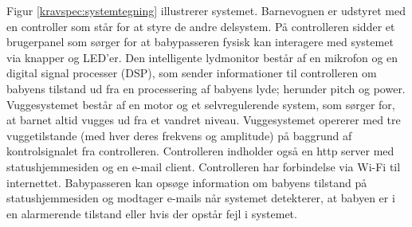 Figur \ref{kravspec:systemtegning} illustrerer systemet. Barnevognen er udstyret med en controller som står for at styre de andre delsystem. På controlleren sidder et brugerpanel som sørger for at babypasseren fysisk kan interagere med systemet via knapper og LED'er.
Den intelligente lydmonitor består af en mikrofon og en digital signal processer (DSP), som sender informationer til controlleren om babyens tilstand ud fra en processering af babyens lyde; herunder pitch og power. Vuggesystemet består af en motor og et selvregulerende system, som sørger for, at barnet altid vugges ud fra et vandret niveau. Vuggesystemet opererer med tre vuggetilstande (med hver deres frekvens og amplitude) på baggrund af kontrolsignalet fra controlleren. Controlleren indholder også en http server med statushjemmesiden og en e-mail client. Controlleren har forbindelse via Wi-Fi til internettet. Babypasseren kan opsøge information om babyens tilstand på statushjemmesiden og modtager e-mails når systemet detekterer, at babyen er i en alarmerende tilstand eller hvis der opstår fejl i systemet.